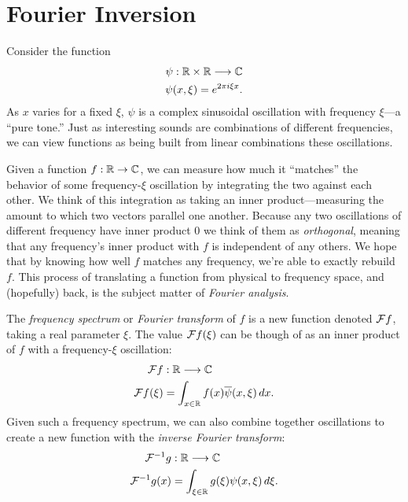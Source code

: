 
  \chapter{Fourier Inversion}
  \label{ch:fourier}

    Consider the function
    \begin{align*}
      \psi:\mathbb{R}\times\mathbb{R}\longrightarrow\mathbb{C}\\
      \psi(x,\xi) = e^{2\pi i \xi x} \text{.}
    \end{align*}
    As $x$ varies for a fixed $\xi$, $\psi$ is a complex sinusoidal oscillation with frequency $\xi$\footnotemark---a ``pure tone.''
    Just as interesting sounds are combinations of different frequencies, we can view functions as being built from linear combinations these oscillations.

    Given a function $f:\mathbb{R}\rightarrow\mathbb{C}$, we can measure how much it ``matches'' the behavior of some frequency-$\xi$ oscillation by integrating the two against each other.
    We think of this integration as taking an inner product---measuring the amount to which two vectors parallel one another.
    Because any two oscillations of different frequency have inner product 0 we think of them as \emph{orthogonal}, meaning that any frequency's inner product with $f$ is independent of any others.
    We hope that by knowing how well $f$ matches any frequency, we're able to exactly rebuild $f$.
    This process of translating a function from physical to frequency space, and (hopefully) back, is the subject matter of \emph{Fourier analysis}.

    \begin{defn}
      The \emph{frequency spectrum} or \emph{Fourier transform} of $f$ is a new function denoted $\mathcal{F} f$, taking a real parameter $\xi$.
      The value $\mathcal{F} f(\xi)$ can be though of as an inner product of $f$ with a frequency-$\xi$ oscillation:
      \begin{align*}
        \mathcal{F} f&:\mathbb{R}\longrightarrow\mathbb{C}\\
        \mathcal{F} f(\xi) &= \int_{x\in\mathbb{R}} f(x)\overline\psi(x,\xi)\,dx \text{.}
      \end{align*}
      Given such a frequency spectrum, we can also combine together oscillations to create a new function with the \emph{inverse Fourier transform}:
      \begin{align*}
        \mathcal{F}^{-1}g&:\mathbb{R}\longrightarrow\mathbb{C}\\
        \mathcal{F}^{-1}g(x) &= \int_{\xi\in\mathbb{R}} g(\xi)\psi(x,\xi)\,d\xi \text{.}
      \end{align*}
    \end{defn}

